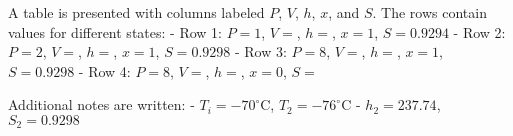 A table is presented with columns labeled \( P \), \( V \), \( h \), \( x \), and \( S \). The rows contain values for different states:  
- Row 1: \( P = 1 \), \( V = \), \( h = \), \( x = 1 \), \( S = 0.9294 \)  
- Row 2: \( P = 2 \), \( V = \), \( h = \), \( x = 1 \), \( S = 0.9298 \)  
- Row 3: \( P = 8 \), \( V = \), \( h = \), \( x = 1 \), \( S = 0.9298 \)  
- Row 4: \( P = 8 \), \( V = \), \( h = \), \( x = 0 \), \( S = \)  

Additional notes are written:  
- \( T_i = -70^\circ\text{C} \), \( T_2 = -76^\circ\text{C} \)  
- \( h_2 = 237.74 \), \( S_2 = 0.9298 \)